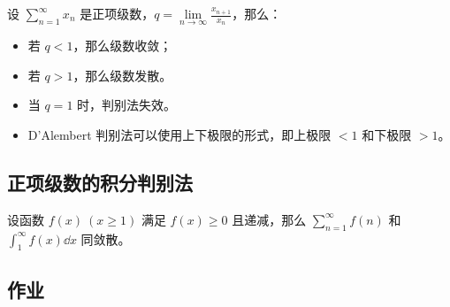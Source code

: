 \begin{theorem}
    设 $\sum\limits_{n = 1}^{\infty} x_n$ 是正项级数，$q = \lim\limits_{n \to \infty} \frac{x_{n + 1}}{x_n}$，那么：
    \begin{itemize}
        \item 若 $q < 1$，那么级数收敛；
        \item 若 $q > 1$，那么级数发散。
    \end{itemize}
\end{theorem}

\begin{remark}
    \begin{itemize}
        \item 当 $q = 1$ 时，判别法失效。
        \item D'Alembert 判别法可以使用上下极限的形式，即上极限 $< 1$ 和下极限 $> 1$。
    \end{itemize}
\end{remark}

\subsection{正项级数的积分判别法}

\begin{theorem}
    设函数 $f(x)\ (x \ge 1)$ 满足 $f(x) \ge 0$ 且递减，那么 $\sum \limits_{n = 1}^{\infty} f(n)$ 和 $\displaystyle \int_1^{\infty} f(x) \dd{x}$ 同敛散。 
\end{theorem}

\subsection{作业}

